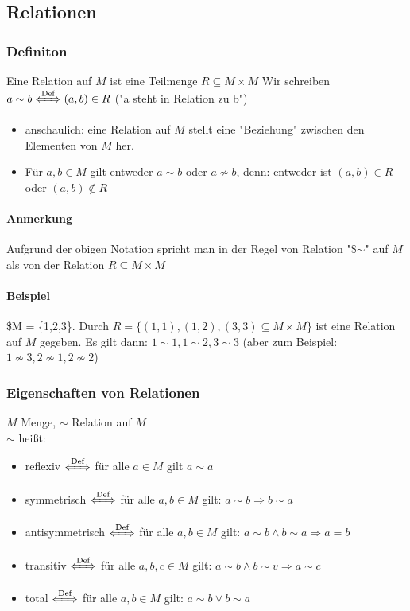 \documentclass[a4paper]{scrartcl}
\begin{document}
\subsection{Relationen}
\label{sec-2-5}
\subsubsection{Definiton}
\label{sec-2-5-1}
Eine Relation auf $M$ ist eine Teilmenge $R\subseteq M\times M$
Wir schreiben $a\sim b \xLeftrightarrow{\text{Def}} (a,b) \in R$ ("a steht in Relation zu b")

\begin{itemize}
\item anschaulich: eine Relation auf $M$ stellt eine "Beziehung" zwischen den Elementen von $M$ her.
\item Für $a,b \in M$ gilt entweder $a\sim b$ oder $a\not\sim b$, denn: entweder ist $(a,b) \in R$ oder $(a,b)\not\in R$
\end{itemize}
\paragraph{Anmerkung}
\label{sec-2-5-1-1}
Aufgrund der obigen Notation spricht man in der Regel von Relation "\$$\sim$" auf $M$ als von der Relation $R \subseteq M\times M$
\paragraph{Beispiel}
\label{sec-2-5-1-2}
\$M = \{1,2,3\}. Durch $R = \{(1,1), (1,2), (3,3) \subseteq M\times M\}$ ist eine Relation auf $M$ gegeben. Es gilt dann: $1\sim 1, 1\sim 2, 3\sim 3$ (aber zum Beispiel: $1\not\sim 3, 2\not\sim 1, 2\not\sim 2$)

\subsubsection{Eigenschaften von Relationen}
\label{sec-2-5-2}
$M$ Menge, $\sim$ Relation auf $M$ \\
    $\sim$ heißt:
\begin{itemize}
\item reflexiv $\xLeftrightarrow{\text{Def}}$ für alle $a\in M$ gilt $a\sim a$
\item symmetrisch $\xLeftrightarrow{\text{Def}}$ für alle $a,b\in M$ gilt: $a\sim b \Rightarrow b\sim a$
\item antisymmetrisch $\xLeftrightarrow{\text{Def}}$ für alle $a,b \in M$ gilt: $a\sim b \wedge b\sim a \Rightarrow a = b$
\item transitiv $\xLeftrightarrow{\text{Def}}$ für alle $a,b,c\in M$ gilt: $a\sim b \wedge b\sim v \Rightarrow a\sim c$
\item total $\xLeftrightarrow{\text{Def}}$ für alle $a,b\in M$ gilt: $a\sim b \vee b\sim a$
\end{itemize}
\end{document}
